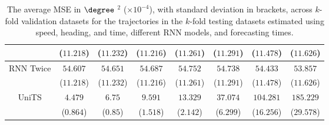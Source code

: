 \begin{table}[!ht]
{\begin{tabular}{|c|c|c|c|c|c|c|c|}
			 & ($11.218$) & ($11.232$) & ($11.216$) & ($11.261$) & ($11.291$) & ($11.478$) & ($11.626$) \\ \hline
			\multirow{2}{*}{RNN Twice} & $54.607$ & $54.651$ & $54.687$ & $54.752$ & $54.738$ & $54.433$ & $53.857$ \\
			 & ($11.218$) & ($11.232$) & ($11.216$) & ($11.261$) & ($11.291$) & ($11.478$) & ($11.626$) \\ \hline
			\multirow{2}{*}{UniTS} & $4.479$ & $6.75$ & $9.591$ & $13.329$ & $37.074$ & $104.281$ & $185.229$ \\
			 & ($0.864$) & ($0.85$) & ($1.518$) & ($2.142$) & ($6.299$) & ($16.256$) & ($29.578$) \\ \hline
		\end{tabular}
	}
	\caption{The average MSE in $\degree$ $^{2}$ ($\times 10^{-4}$), with standard deviation in brackets, across $k$-fold validation datasets for the trajectories in the $k$-fold testing datasets estimated using speed, heading, and time, different RNN models, and forecasting times.}
	\label{tab:all_speed_actual_dir_MSE}
\end{table}